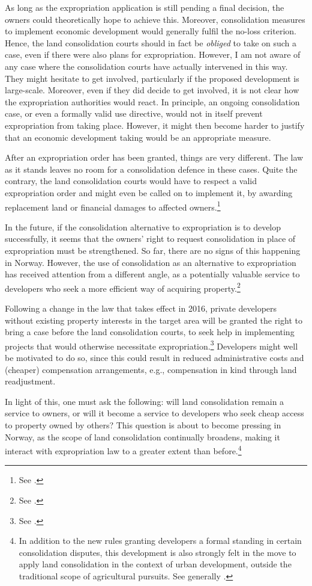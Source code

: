As long as the expropriation application is still pending a final decision, the owners could theoretically hope to achieve this. Moreover, consolidation measures to implement economic development would generally fulfil the no-loss criterion. Hence, the land consolidation courts should in fact be {\it obliged} to take on such a case, even if there were also plans for expropriation. However, I am not aware of any case where the consolidation courts have actually intervened in this way. They might hesitate to get involved, particularly if the proposed development is large-scale. Moreover, even if they did decide to get involved, it is not clear how the expropriation authorities would react. In principle, an ongoing consolidation case, or even a formally valid use directive, would not in itself prevent expropriation from taking place. However, it might then become harder to justify that an economic development taking would be an appropriate measure.

After an expropriation order has been granted, things are very different. The law as it stands leaves no room for a consolidation defence in these cases. Quite the contrary, the land consolidation courts would have to respect a valid expropriation order and might even be called on to implement it, by awarding replacement land or financial damages to affected owners.\footnote{See \dni\cite[6]{lca79}.}

In the future, if the consolidation alternative to expropriation is to develop successfully, it seems that the owners' right to request consolidation in place of expropriation must be strengthened. So far, there are no signs of this happening in Norway. However, the use of consolidation as an alternative to expropriation has received attention from a different angle, as a potentially valuable service to developers who seek a more efficient way of acquiring property.\footnote{See \cite[84]{prop12}.}

Following a change in the law that takes effect in 2016, private developers without existing property interests in the target area will be granted the right to bring a case before the land consolidation courts, to seek help in implementing projects that would otherwise necessitate expropriation.\footnote{See \dni\cite[1-5(3)]{lca13}.} Developers might well be motivated to do so, since this could result in reduced administrative costs and (cheaper) compensation arrangements, e.g., compensation in kind through land readjustment.

In light of this, one must ask the following: will land consolidation remain a service to owners, or will it become a service to developers who seek cheap access to property owned by others? This question is about to become pressing in Norway, as the scope of land consolidation continually broadens, making it interact with expropriation law to a greater extent than before.\footnote{In addition to the new rules granting developers a formal standing in certain consolidation disputes, this development is also strongly felt in the move to apply land consolidation in the context of urban development, outside the traditional scope of agricultural pursuits. See generally \cite{stenseth07}.}

